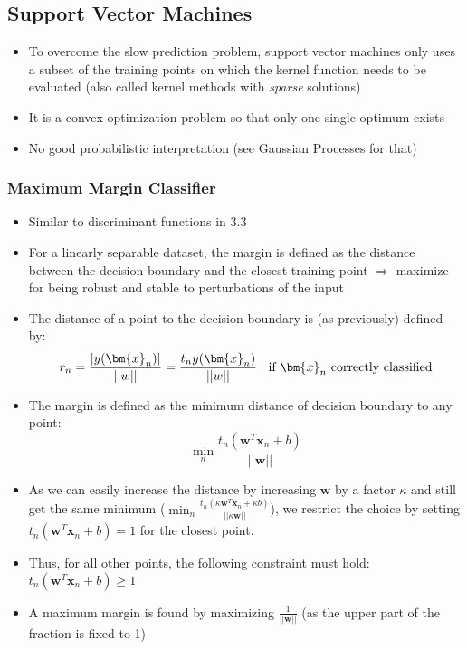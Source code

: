\subsection{Support Vector Machines}
\begin{itemize}
	\item To overcome the slow prediction problem, support vector machines only uses a subset of the training points on which the kernel function needs to be evaluated (also called kernel methods with \textit{sparse} solutions)
	\item It is a convex optimization problem so that only one single optimum exists
	\item No good probabilistic interpretation (see Gaussian Processes for that)
\end{itemize}
\subsubsection{Maximum Margin Classifier}
\begin{itemize}
	\item Similar to discriminant functions in 3.3
	\item For a linearly separable dataset, the margin is defined as the distance between the decision boundary and the closest training point $\Rightarrow$ maximize for being robust and stable to perturbations of the input
	\item The distance of a point to the decision boundary is (as previously) defined by:
	$$r_n = \frac{|y(\bm{x}_n)|}{||w||} = \frac{t_ny(\bm{x}_n)}{||w||}\text{\hspace{2mm} if } \bm{x}_n \text{ correctly classified}$$ 
	\item The margin is defined as the minimum distance of decision boundary to any point:
	$$\min_n \frac{t_n \left(\bm{w}^T\bm{x}_n + b\right)}{||\bm{w}||} $$
	\item As we can easily increase the distance by increasing $\bm{w}$ by a factor $\kappa$ and still get the same minimum ($\min_n \frac{t_n \left(\kappa \bm{w}^T\bm{x}_n + \kappa b\right)}{||\kappa \bm{w}||}$), we restrict the choice by setting $t_n \left(\bm{w}^T\bm{x}_n + b\right) = 1$ for the closest point. 
	\item Thus, for all other points, the following constraint must hold: $t_n \left(\bm{w}^T\bm{x}_n + b\right) \geq 1$
	\item A maximum margin is found by maximizing $\frac{1}{||\bm{w}||}$ (as the upper part of the fraction is fixed to 1)
\end{itemize}
